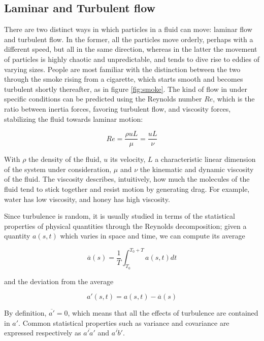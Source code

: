 \documentclass[12pt]{book}
\begin{document}
\subsection{Laminar and Turbulent flow}
There are two distinct ways in which particles in a fluid can move: laminar flow and turbulent flow. In the former, all the particles move orderly, perhaps with a different speed, but all in the same direction, whereas in the latter the movement of particles is highly chaotic and unpredictable, and tends to dive rise to eddies of varying sizes. People are most familiar with the distinction between the two through the smoke rising from a cigarette, which starts smooth and becomes turbulent shortly thereafter, as in figure \ref{fig:smoke}. The kind of flow in under specific conditions can be predicted using the Reynolds number $Re$, which is the ratio between inertia forces, favoring turbulent flow, and viscosity forces, stabilizing the fluid towards laminar motion:

$$
Re=\frac{\rho u L}{\mu}=\frac{uL}{\nu}
$$

With $\rho$ the density of the fluid, $u$ its velocity, $L$ a characteristic linear dimension of the system under consideration, $\mu$ and $\nu$ the kinematic and dynamic viscosity of the fluid. The viscosity describes, intuitively, how much the molecules of the fluid tend to stick together and resist motion by generating drag. For example, water has low viscosity, and honey has high viscosity.

Since turbulence is random, it is usually studied in terms of the statistical properties of physical quantities through the Reynolds decomposition; given a quantity $a(s,t)$ which varies in space and time, we can compute its average

$$
\overline{a}(s)=\frac{1}{T}\int_{T_0}^{T_0+T}a(s,t)dt
$$

and the deviation from the average

$$
a'(s,t)=a(s,t)-\overline{a}(s)
$$

By definition, $\overline{a'}=0$, which means that all the effects of turbulence are contained in $a'$. Common statistical properties such as variance and covariance are expressed respectively as $\overline{a'a'}$ and $\overline{a'b'}$.
\end{document}
